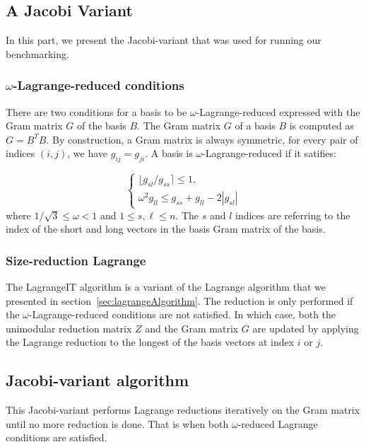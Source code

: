 \documentclass[10pt, a4paper]{article}
\begin{document}



\subsection{A Jacobi Variant}

In this part, we present the Jacobi-variant that was used for running our benchmarking.

\subsubsection{$\omega$-Lagrange-reduced conditions}
There are two conditions for a basis to be $\omega$-Lagrange-reduced expressed with the Gram matrix $G$ of the basis $B$. The Gram matrix $G$ of a basis $B$ is computed as $G = B^T B$. By construction, a Gram matrix is always symmetric, for every pair of indices $(i,j)$, we have $g_{ij} = g_{ji}$. A basis is $\omega$-Lagrange-reduced if it satifies:

\[
\begin{cases}
\lfloor g_{sl} / g_{ss} \rceil \leq 1, \\
\omega^2 g_{ll} \leq g_{ss} + g_{ll} - 2|g_{sl}|

\end{cases}
\]  where $1/\sqrt{3} \leq \omega < 1$ and $1\leq s,\ell \leq n $. The $s$ and $l$ indices are referring to the index of the short and long vectors in the basis Gram matrix of the basis. 

\subsubsection{Size-reduction Lagrange}
The LagrangeIT algorithm is a variant of the Lagrange algorithm that we presented in section~\ref{sec:lagrangeAlgorithm}. The reduction is only performed if the $\omega$-Lagrange-reduced conditions are not satisfied. In which case, both the unimodular reduction matrix $Z$ and the Gram matrix $G$ are updated by applying the Lagrange reduction to the longest of the basis vectors at index $i$ or $j$.



\subsection{Jacobi-variant algorithm}
This Jacobi-variant performs Lagrange reductions iteratively on the Gram matrix until no more reduction is done. That is when both $\omega$-reduced Lagrange conditions are satisfied. 
\end{document}
